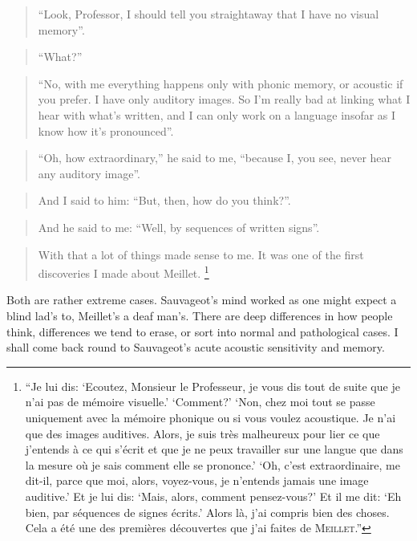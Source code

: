 \documentclass[output=paper]{langscibook}
\begin{document}
\begin{quotation}
``Look, Professor, I should tell you straightaway that I have no visual memory''.
\end{quotation}

\begin{quotation}
``What?''
\end{quotation}

\begin{quotation}
``No, with me everything happens only with phonic memory, or acoustic if you prefer. I have only auditory images. So I'm really bad at linking what I hear with what’s written, and I can only work on a language insofar as I know how it’s pronounced''.
\end{quotation}

\begin{quotation}
``Oh, how extraordinary,'' he said to me, ``because I, you see, never hear any auditory image''.
\end{quotation}

\begin{quotation}
And I said to him: ``But, then, how do you think?''.
\end{quotation}

\begin{quotation}
And he said to me: ``Well, by sequences of written signs''.
\end{quotation}

\begin{quotation}
With that a lot of things made sense to me. It was one of the first discoveries I made about Meillet. \citep[193]{Sauvageot1992}\footnote{``Je lui dis: `Ecoutez, Monsieur le Professeur, je vous dis tout de suite que je n'ai pas de mémoire visuelle.' `Comment?' `Non, chez moi tout se passe uniquement avec la mémoire phonique ou si vous voulez acoustique. Je n'ai que des images auditives. Alors, je suis très malheureux pour lier ce que j'entends à ce qui s'écrit et que je ne peux travailler sur une langue que dans la mesure où je sais comment elle se prononce.' `Oh, c'est extraordinaire, me dit-il, parce que moi, alors, voyez-vous, je n'entends jamais une image auditive.' Et je lui dis: `Mais, alors, comment pensez-vous?' Et il me dit: `Eh bien, par séquences de signes écrits.' Alors là, j'ai compris bien des choses. Cela a été une des premières découvertes que j'ai faites de \textsc{Meillet}.''}
\end{quotation}

Both are rather extreme cases. Sauvageot's mind worked as one might expect a blind lad's to, Meillet's a deaf man's. There are deep differences in how people think, differences we tend to erase, or sort into normal and pathological cases. I shall come back round to Sauvageot’s acute acoustic sensitivity and memory.
\end{document}
